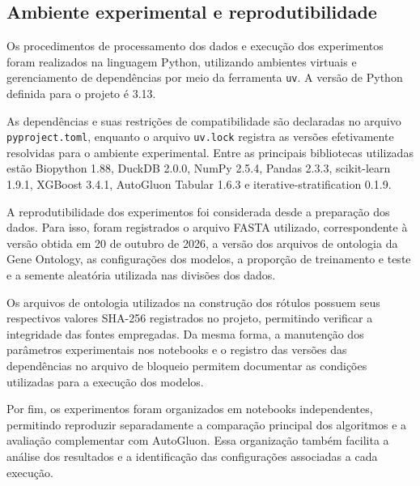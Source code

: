 \subsection{Ambiente experimental e reprodutibilidade}
\label{subsec:ambiente}

Os procedimentos de processamento dos dados e execução dos experimentos foram realizados na linguagem Python, utilizando ambientes virtuais e gerenciamento de dependências por meio da ferramenta \texttt{uv}. A versão de Python definida para o projeto é 3.13.

As dependências e suas restrições de compatibilidade são declaradas no arquivo \texttt{pyproject.toml}, enquanto o arquivo \texttt{uv.lock} registra as versões efetivamente resolvidas para o ambiente experimental. Entre as principais bibliotecas utilizadas estão Biopython 1.88, DuckDB 2.0.0, NumPy 2.5.4, Pandas 2.3.3, scikit-learn 1.9.1, XGBoost 3.4.1, AutoGluon Tabular 1.6.3 e iterative-stratification 0.1.9.

A reprodutibilidade dos experimentos foi considerada desde a preparação dos dados. Para isso, foram registrados o arquivo FASTA utilizado, correspondente à versão obtida em 20 de outubro de 2026, a versão dos arquivos de ontologia da Gene Ontology, as configurações dos modelos, a proporção de treinamento e teste e a semente aleatória utilizada nas divisões dos dados.

Os arquivos de ontologia utilizados na construção dos rótulos possuem seus respectivos valores SHA-256 registrados no projeto, permitindo verificar a integridade das fontes empregadas. Da mesma forma, a manutenção dos parâmetros experimentais nos notebooks e o registro das versões das dependências no arquivo de bloqueio permitem documentar as condições utilizadas para a execução dos modelos.

Por fim, os experimentos foram organizados em notebooks independentes, permitindo reproduzir separadamente a comparação principal dos algoritmos e a avaliação complementar com AutoGluon. Essa organização também facilita a análise dos resultados e a identificação das configurações associadas a cada execução.
